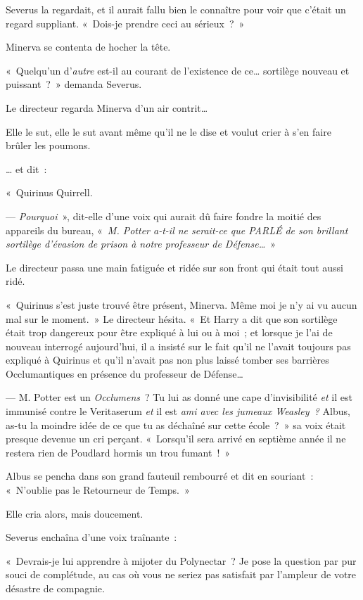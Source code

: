 Severus la regardait, et il aurait fallu bien le connaître pour voir que c'était un regard suppliant. «~Dois-je prendre ceci au sérieux~?~»

Minerva se contenta de hocher la tête.

«~Quelqu'un d'\emph{autre} est-il au courant de l'existence de ce… sortilège nouveau et puissant~?~» demanda Severus.

Le directeur regarda Minerva d'un air contrit…

Elle le sut, elle le sut avant même qu'il ne le dise et voulut crier à s'en faire brûler les poumons.

… et dit~:

«~Quirinus Quirrell.

--- \emph{Pourquoi}~», dit-elle d'une voix qui aurait dû faire fondre la moitié des appareils du bureau, «~\emph{M. Potter a-t-il ne serait-ce que PARLÉ de son brillant sortilège d'évasion de prison à notre professeur de Défense…}~»

Le directeur passa une main fatiguée et ridée sur son front qui était tout aussi ridé.

«~Quirinus s'est juste trouvé être présent, Minerva. Même moi je n'y ai vu aucun mal sur le moment.~» Le directeur hésita. «~Et Harry a dit que son sortilège était trop dangereux pour être expliqué à lui ou à moi~; et lorsque je l'ai de nouveau interrogé aujourd'hui, il a insisté sur le fait qu'il ne l'avait toujours pas expliqué à Quirinus et qu'il n'avait pas non plus laissé tomber ses barrières Occlumantiques en présence du professeur de Défense…

--- M. Potter est un \emph{Occlumens}~? Tu lui as donné une cape d'invisibilité \emph{et} il est immunisé contre le Veritaserum \emph{et} il est \emph{ami avec les jumeaux Weasley~?} Albus, as-tu la moindre idée de ce que tu as déchaîné sur cette école~?~» sa voix était presque devenue un cri perçant. «~Lorsqu'il sera arrivé en septième année il ne restera rien de Poudlard hormis un trou fumant~!~»

Albus se pencha dans son grand fauteuil rembourré et dit en souriant~: «~N'oublie pas le Retourneur de Temps.~»

Elle cria alors, mais doucement.

Severus enchaîna d'une voix traînante~:

«~Devrais-je lui apprendre à mijoter du Polynectar~? Je pose la question par pur souci de complétude, au cas où vous ne seriez pas satisfait par l'ampleur de votre désastre de compagnie.

